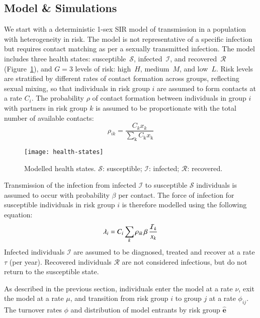 \subsection{Model \& Simulations}\label{ss:model-sim}
We start with a deterministic 1-sex SIR model of transmission
in a population with heterogeneity in risk.
The model is not representative of a specific infection but requires contact matching
as per a sexually transmitted infection.
The model includes three health states:
susceptible~$\mathcal{S}$, infected~$\mathcal{I}$, and recovered~$\mathcal{R}$
(Figure~\ref{fig:health-states}),
and $G = 3$ levels of risk:
high~$H$, medium~$M$, and low~$L$.
Risk levels are stratified by different rates of
contact formation across groups, reflecting sexual mixing,
so that individuals in risk group $i$ are assumed to
form contacts at a rate $C_{i}$.
The probability $\rho$ of contact formation between individuals in group $i$
with partners in risk group $k$ is assumed to
be proportionate with the total number of available contacts:
\begin{equation}
  \rho_{ik} = \frac 
    {C_k x_k}
    {\sum_{\mathrm{k}}C_{\mathrm{k}} x_{\mathrm{k}}}
    \label{eq:rho}
\end{equation}
\begin{figure}
  \centering
  \texttt{[image: health-states]}
  \caption{Modelled health states.
  $\mathcal{S}$: susceptible;
  $\mathcal{I}$: infected;
  $\mathcal{R}$: recovered.}
  \label{fig:health-states}
\end{figure}
\par
Transmission of the infection from infected $\mathcal{I}$ to susceptible $\mathcal{S}$ individuals
is assumed to occur with probability $\beta$ per contact.
The force of infection for susceptible individuals in risk group $i$
is therefore modelled using the following equation:
\begin{equation}
  \lambda_{i} =
  C_{i} \sum_k \rho_{ik} \thinspace  \beta \thinspace \frac{\mathcal{I}_k}{x_k}
  \label{eq:foi}
\end{equation}
Infected individuals $\mathcal{I}$ are assumed to
be diagnosed, treated and recover at a rate $\tau$ (per year).
Recovered individuals $\mathcal{R}$ are not considered infectious,
but do not return to the susceptible state.
\par
As described in the previous section, individuals
enter the model at a rate $\nu$,
exit the model at a rate $\mu$,
and transition from risk group $i$ to group $j$ at a rate $\phi_{ij}$.
The turnover rates $\phi$ and distribution of model entrants by risk group $\bm{\hat{e}}$
